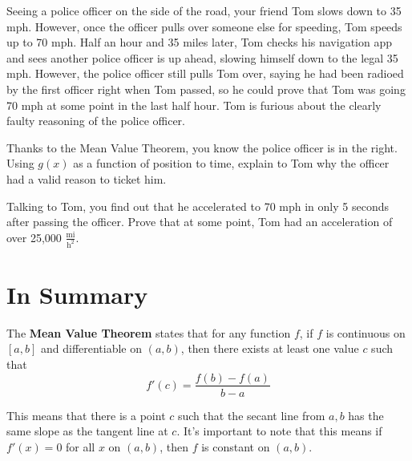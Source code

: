 \documentclass{ximera}
\begin{document}
\begin{question}
Seeing a police officer on the side of the road, your friend Tom slows down to 35 mph. However, once the officer pulls over someone else for speeding, Tom speeds up to 70 mph. Half an hour and 35 miles later, Tom checks his navigation app and sees another police officer is up ahead, slowing himself down to the legal 35 mph. However, the police officer still pulls Tom over, saying he had been radioed by the first officer right when Tom passed, so he could prove that Tom was going 70 mph at some point in the last half hour. Tom is furious about the clearly faulty reasoning of the police officer.

Thanks to the Mean Value Theorem, you know the police officer is in the right. Using $g(x)$ as a function of position to time, explain to Tom why the officer had a valid reason to ticket him.

\begin{freeResponse}
\end{freeResponse}

Talking to Tom, you find out that he accelerated to 70 mph in only 5 seconds after passing the officer. Prove that at some point, Tom had an acceleration of over 25,000 $\frac{\text{mi}}{\text{h}^2}$.

\begin{freeResponse}
\end{freeResponse}
\end{question}

\section{In Summary}

\begin{definition}
The \textbf{Mean Value Theorem} states that for any function $f$, if $f$ is continuous on $[a,b]$ and differentiable on $(a,b)$, then there exists at least one value $c$ such that $$f'(c)=\frac{f(b)-f(a)}{b-a}$$

This means that there is a point $c$ such that the secant line from $a, b$ has the same slope as the tangent line at $c$. It's important to note that this means if $f'(x)=0$ for all $x$ on $(a,b)$, then $f$ is constant on $(a,b)$.
\end{definition}
\end{document}
